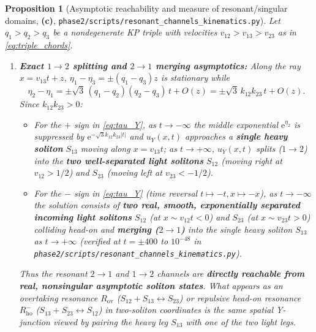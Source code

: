\documentclass[11pt,a4paper]{article}
\newcommand{\Lc}{\textsf{\textbf{(c)}}\xspace}
\newcommand{\ee}{\mathrm{e}}
\newcommand{\skin}{\texttt{phase2/\allowbreak scripts/\allowbreak resonant\_\allowbreak channels\_\allowbreak kinematics.py}}
\newtheorem{proposition}{Proposition}[section]
\theoremstyle{remark}
\begin{document}
\begin{proposition}[Asymptotic reachability and measure of resonant/singular domains, \Lc, \skin]\label{prop:reachability}
Let $q_1 > q_2 > q_3$ be a nondegenerate KP triple with velocities
$v_{12} > v_{13} > v_{23}$ as in \eqref{eq:triple_chords}.
\begin{enumerate}
\item \textbf{Exact $1\to 2$ splitting and $2\to 1$ merging asymptotics:}
Along the ray $x = v_{13} t + z$, $\eta_1 - \eta_3 = \pm(q_1-q_3)z$ is
stationary while
\begin{equation}\label{eq:transverse_exponent}
  \eta_2 - \eta_1 = \pm\sqrt{3}\,(q_1 - q_2)(q_2 - q_3)\,t + O(z)
                  = \pm\sqrt{3}\,k_{12}k_{23}\,t + O(z).
\end{equation}
Since $k_{12}k_{23} > 0$:
\begin{itemize}
\item For the $+$ sign in \eqref{eq:tau_Y}, as $t\to -\infty$ the middle
exponential $\ee^{\eta_2}$ is suppressed by $\ee^{-\sqrt{3}k_{12}k_{23}|t|}$ and
$u_Y(x,t)$ approaches a \textbf{single heavy soliton} $S_{13}$ moving along
$x = v_{13}t$; as $t\to +\infty$, $u_Y(x,t)$ splits ($1\to 2$) into the
\textbf{two well-separated light solitons} $S_{12}$ (moving right at $v_{12}>1/2$)
and $S_{23}$ (moving left at $v_{23}<-1/2$).
\item For the $-$ sign in \eqref{eq:tau_Y} (time reversal $t\mapsto -t,x\mapsto -x$),
as $t\to -\infty$ the solution consists of \textbf{two real, smooth,
exponentially separated incoming light solitons} $S_{12}$ (at $x\sim v_{12}t<0$)
and $S_{23}$ (at $x\sim v_{23}t>0$) colliding head-on and \textbf{merging
($2\to 1$)} into the single heavy soliton $S_{13}$ as $t\to +\infty$ (verified
at $t=\pm 400$ to $10^{-48}$ in \skin).
\end{itemize}
Thus the resonant $2\to 1$ and $1\to 2$ channels are \textbf{directly reachable
from real, nonsingular asymptotic soliton states}. What appears as an overtaking
resonance $R_{\mathrm{ov}}$ ($S_{12}+S_{13}\leftrightarrow S_{23}$) or repulsive
head-on resonance $R_{\mathrm{ho}}^-$ ($S_{13}+S_{23}\leftrightarrow S_{12}$) in
two-soliton coordinates is the \emph{same} spatial Y-junction viewed by pairing
the heavy leg $S_{13}$ with one of the two light legs.


\end{enumerate}
\end{proposition}
\end{document}
